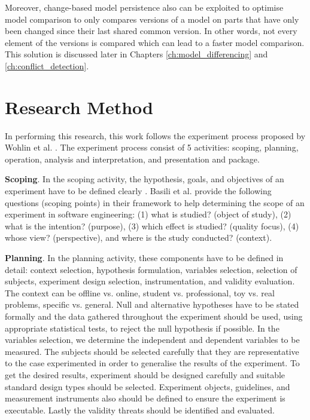 Moreover, change-based model persistence also can be exploited to optimise model comparison to only compares versions of a model on parts that have only been changed since their last shared common version. In other words, not every element of the versions is compared which can lead to a faster model comparison. This solution is discussed later in Chapters \ref{ch:model_differencing} and \ref{ch:conflict_detection}. 

\section{Research Method}
\label{sec:research_method}
In performing this research, this work follows the experiment process proposed by Wohlin et al. \cite{DBLP:books/daglib/0029933/Wohlin}. The experiment process consist of 5 activities: scoping, planning, operation, analysis and interpretation, and presentation and package.

\textbf{Scoping}. In the scoping activity, the hypothesis, goals, and objectives of an experiment have to be defined clearly \cite{DBLP:books/daglib/0029933/Wohlin}. Basili et al. \cite{basili1988tame} provide the following questions (scoping points) in their framework to help determining the scope of an experiment in software engineering: (1) what is studied? (object of study), (2) what is the intention? (purpose), (3) which effect is studied? (quality focus), (4) whose view? (perspective), and where is the study conducted? (context).


\textbf{Planning}. In the planning activity, these components have to be defined in detail: context selection, hypothesis formulation, variables selection, selection of subjects, experiment design selection, instrumentation, and validity evaluation\cite{DBLP:books/daglib/0029933/Wohlin}. The context can be offline vs. online, student vs. professional, toy vs. real problems, specific vs. general. Null and alternative hypotheses have to be stated formally and the data gathered throughout the experiment should be used, using appropriate statistical tests, to reject the null hypothesis if possible. In the variables selection, we determine the independent and dependent variables to be measured. The subjects should be selected carefully that they are representative to the case experimented in order to generalise the results of the experiment. To get the desired results, experiment should be designed carefully and suitable standard design types should be selected. Experiment objects, guidelines, and measurement instruments also should be defined to ensure the experiment is executable. Lastly the validity threats should be identified and evaluated.

